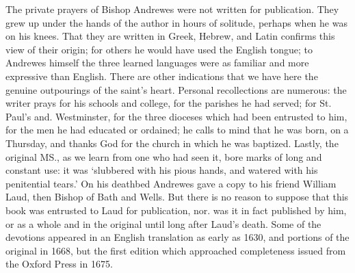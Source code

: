 The private prayers of Bishop Andrewes were not written for publication. They grew up under the hands of the author in hours of solitude, perhaps when he was on his knees. That they are written in Greek, Hebrew, and Latin confirms this view of their origin; for others he would have used the English tongue; to Andrewes himself the three learned languages were as familiar and more expressive than  English. There are other indications that we have here the genuine outpourings of the saint's heart. Personal recollections are numerous: the writer prays for his schools and college, for the parishes he had served; for St. Paul's and. Westminster, for the three dioceses which had been entrusted to him, for the men he had educated or ordained; he calls to mind that he was born, on a Thursday, and thanks God for the church in which he was baptized. Lastly, the original MS., as we learn from one who had seen it, bore marks of long and constant use: it was ‘slubbered with his pious hands, and watered with his penitential tears.’ On his deathbed Andrewes gave a copy to his friend William Laud, then Bishop of Bath and Wells. But there is no reason to suppose that this book was entrusted to Laud for publication, nor. was it in fact published by him, or as a whole and in the original until long after Laud’s death. Some of the devotions appeared in an English translation as  early as 1630, and portions of the original in 1668, but the first edition which approached completeness issued from the Oxford Press in 1675.

